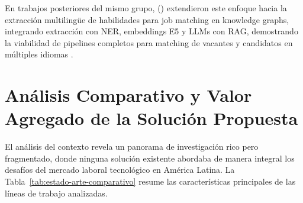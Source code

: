 En trabajos posteriores del mismo grupo, \citeauthor{kavas2025} (\citeyear{kavas2025}) extendieron este enfoque hacia la extracción multilingüe de habilidades para job matching en knowledge graphs, integrando extracción con NER, embeddings E5 y LLMs con RAG, demostrando la viabilidad de pipelines completos para matching de vacantes y candidatos en múltiples idiomas \parencite{kavas2025}.

\section{Análisis Comparativo y Valor Agregado de la Solución Propuesta}

El análisis del contexto revela un panorama de investigación rico pero fragmentado, donde ninguna solución existente abordaba de manera integral los desafíos del mercado laboral tecnológico en América Latina. La Tabla~\ref{tab:estado-arte-comparativo} resume las características principales de las líneas de trabajo analizadas.

